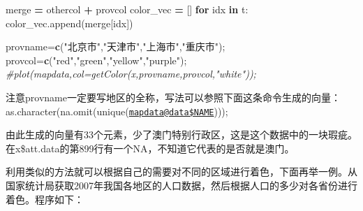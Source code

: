 \documentclass[]{article}
\newenvironment{Shaded}{\begin{snugshade}}{\end{snugshade}}
\newcommand{\KeywordTok}[1]{\textcolor[rgb]{0.13,0.29,0.53}{\textbf{#1}}}
\newcommand{\StringTok}[1]{\textcolor[rgb]{0.31,0.60,0.02}{#1}}
\newcommand{\CommentTok}[1]{\textcolor[rgb]{0.56,0.35,0.01}{\textit{#1}}}
\newcommand{\ControlFlowTok}[1]{\textcolor[rgb]{0.13,0.29,0.53}{\textbf{#1}}}
\newcommand{\OperatorTok}[1]{\textcolor[rgb]{0.81,0.36,0.00}{\textbf{#1}}}
\newcommand{\NormalTok}[1]{#1}
\begin{document}
\begin{Shaded}
\begin{Highlighting}[]
\NormalTok{merge }\OperatorTok{=}\NormalTok{ othercol }\OperatorTok{+}\NormalTok{ provcol}
\NormalTok{color_vec }\OperatorTok{=}\NormalTok{ []}
\ControlFlowTok{for}\NormalTok{ idx }\KeywordTok{in}\NormalTok{ t:}
\NormalTok{  color_vec.append(merge[idx])}
\end{Highlighting}
\end{Shaded}

\begin{Shaded}
\begin{Highlighting}[]
\NormalTok{provname=}\KeywordTok{c}\NormalTok{(}\StringTok{"北京市"}\NormalTok{,}\StringTok{"天津市"}\NormalTok{,}\StringTok{"上海市"}\NormalTok{,}\StringTok{"重庆市"}\NormalTok{);}
\NormalTok{provcol=}\KeywordTok{c}\NormalTok{(}\StringTok{"red"}\NormalTok{,}\StringTok{"green"}\NormalTok{,}\StringTok{"yellow"}\NormalTok{,}\StringTok{"purple"}\NormalTok{);}
\CommentTok{#plot(mapdata,col=getColor(x,provname,provcol,"white"));}
\end{Highlighting}
\end{Shaded}

注意provname一定要写地区的全称，写法可以参照下面这条命令生成的向量：
as.character(na.omit(unique(\href{mailto:mapdata@data$NAME}{\nolinkurl{mapdata@data\$NAME}})));

由此生成的向量有33个元素，少了澳门特别行政区，这是这个数据中的一块瑕疵。在x\$att.data的第899行有一个NA，不知道它代表的是否就是澳门。

利用类似的方法就可以根据自己的需要对不同的区域进行着色，下面再举一例。从国家统计局获取2007年我国各地区的人口数据，然后根据人口的多少对各省份进行着色。程序如下：
\end{document}
